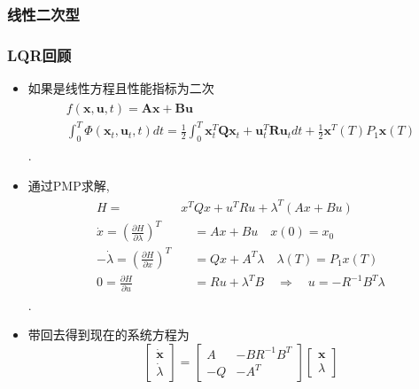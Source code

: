 \documentclass[UTF8, aspectratio=169, 9pt]{ctexbeamer}
\begin{document}
\subsubsection{线性二次型}
\begin{frame}
  \frametitle{LQR回顾}
  \begin{itemize}
  \item 如果是线性方程且性能指标为二次
    \begin{align}
      \begin{split}
        f( \boldsymbol{x}, \boldsymbol{u}, t ) = \boldsymbol{A x} +
        \boldsymbol{B u} \\
        \int_0^T \Phi ( \boldsymbol{x}_t,  \boldsymbol{u}_t, t ) dt  =
        \frac{1}{2} \int_0^T \boldsymbol{x}^T_t \boldsymbol{Q} \boldsymbol{x}_t
        + \boldsymbol{u}^T_t \boldsymbol{R} \boldsymbol{u}_t dt
        + \frac{1}{2} \boldsymbol{x}^{T}(T) P_{1} \boldsymbol{x}(T)
      \end{split}
    \end{align}.
  \item 通过PMP求解,
  \begin{align}
  \begin{split}
  H= & x^{T} Q x+u^{T} R u+\lambda^{T}(A x+B u) \\
  \dot{x}=\left(\frac{\partial H}{\partial \lambda}\right)^{T} & \quad=A x+B u \quad x(0)=x_{0} \\
  -\dot{\lambda}=\left(\frac{\partial H}{\partial x}\right)^{T} & \quad=Q x+A^{T} \lambda \quad \lambda(T)=P_{1} x(T) \\
  0=\frac{\partial H}{\partial u} & \quad=R u+\lambda^{T} B \quad \Rightarrow \quad u=-R^{-1} B^{T} \lambda
  \end{split}
  \end{align}.
  \item 带回去得到现在的系统方程为
  $$
  \left[\begin{array}{c}
    \dot{\boldsymbol{x}} \\
    \dot{\lambda}
    \end{array}\right]=\left[\begin{array}{cc}
    A & -B R^{-1} B^{T} \\
    -Q & -A^{T}
    \end{array}\right]\left[\begin{array}{c}
    \boldsymbol{x} \\
    \lambda
  \end{array}\right]
  $$
  \end{itemize}
\end{frame}
\end{document}
